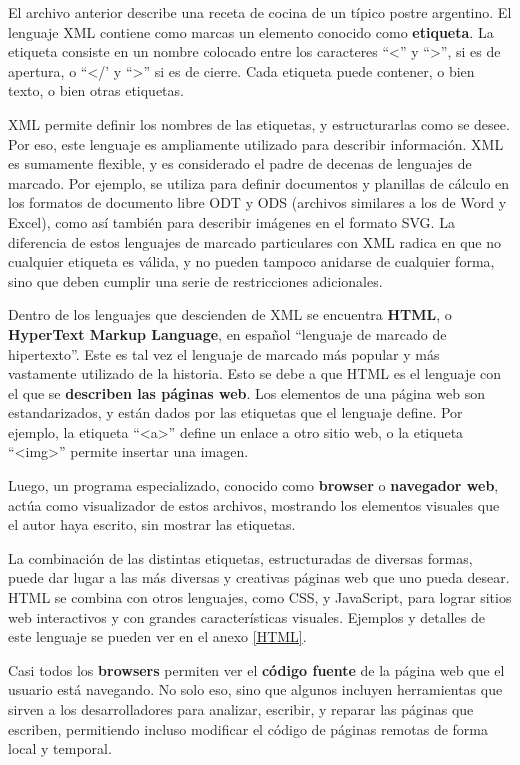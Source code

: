 El archivo anterior describe una receta de cocina de un típico postre argentino.
El lenguaje XML contiene como marcas un elemento conocido como \textbf{etiqueta}.
La etiqueta consiste en un nombre colocado entre los caracteres ``<'' y ``>'',
si es de apertura, o ``</' y ``>'' si es de cierre. Cada etiqueta puede contener,
o bien texto, o bien otras etiquetas.

XML permite definir los nombres de las etiquetas, y estructurarlas como se desee.
Por eso, este lenguaje es ampliamente utilizado para describir información.
XML es sumamente flexible, y es considerado el padre de decenas de lenguajes de
marcado. Por ejemplo, se utiliza para definir documentos y planillas de cálculo
en los formatos de documento libre ODT y ODS (archivos similares a los de Word y
Excel), como así también para describir imágenes en el formato SVG. La diferencia
de estos lenguajes de marcado particulares con XML radica en que no cualquier
etiqueta es válida, y no pueden tampoco anidarse de cualquier forma, sino que
deben cumplir una serie de restricciones adicionales.

Dentro de los lenguajes que descienden de XML se encuentra \textbf{HTML}, o
\textbf{HyperText Markup Language}, en español ``lenguaje de marcado de hipertexto''.
Este es tal vez el lenguaje de marcado más popular y más vastamente utilizado de
la historia. Esto se debe a que HTML es el lenguaje con el que se \textbf{describen
las páginas web}. Los elementos de una página web son estandarizados, y están
dados por las etiquetas que el lenguaje define. Por ejemplo, la etiqueta
``<a>'' define un enlace a otro sitio web, o la etiqueta ``<img>'' permite insertar
una imagen.

Luego, un programa especializado, conocido como \textbf{browser} o \textbf{navegador
web}, actúa como visualizador de estos archivos, mostrando los elementos visuales
que el autor haya escrito, sin mostrar las etiquetas.

La combinación de las distintas etiquetas, estructuradas de diversas formas,
puede dar lugar a las más diversas y creativas páginas web que uno pueda desear.
HTML se combina con otros lenguajes, como CSS, y JavaScript, para lograr sitios
web interactivos y con grandes características visuales. Ejemplos y detalles de
este lenguaje se pueden ver en el anexo \ref{HTML}.

\begin{knowwhat}
    Casi todos los \textbf{browsers} permiten ver el \textbf{código fuente} de
    la página web que el usuario está navegando. No solo eso, sino que algunos
    incluyen herramientas que sirven a los desarrolladores para analizar, escribir,
    y reparar las páginas que escriben, permitiendo incluso modificar el código
    de páginas remotas de forma local y temporal.
\end{knowwhat}

